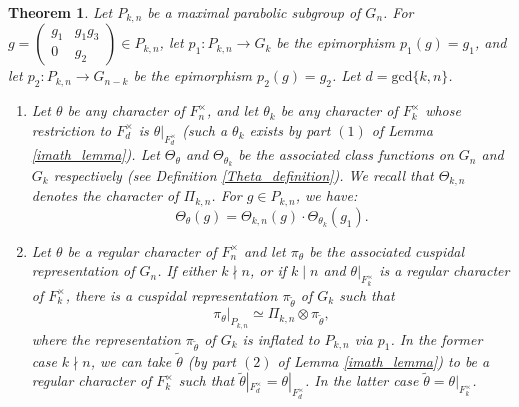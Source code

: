 \documentclass[reqno]{amsart}
\newtheorem{theorem}{Theorem}[section]
\theoremstyle{definition}
\theoremstyle{remark}
\numberwithin{equation}{section}
\DeclareMathOperator{\Ind}{Ind}
\DeclareMathOperator{\St}{St}
\newcommand{\bbsm}{\left (\begin{smallmatrix}}      \newcommand{\besm}{\end{smallmatrix}\right )}
\begin{document}
{{%
  \begin{theorem} \label{Pi_universal_property}
        Let $P_{k,n}$ be a maximal parabolic subgroup of $G_n$. For $g  = \bbsm g_1 & g_1 g_3 \\0 & g_2 \besm \in P_{k,n}$, let $p_1 \colon P_{k,n} \to G_k$ be the epimorphism $p_1(g)=g_1$, and let $p_2 \colon P_{k,n} \to G_{n-k}$ be the epimorphism $p_2(g)=g_2$. Let $d=\text{gcd}\{k,n\}$.
     \begin{enumerate}
         \item[\emph{(1)}] Let $\theta$ be any character of $F_n^\times$, and let 
         $\theta_k$ be any character of $F_k^\times$ whose restriction to $F_d^\times$ is $\theta|_{F_d^\times}$ (such a $\theta_k$ exists by  part $(1)$ of Lemma \ref{imath_lemma}). Let $\Theta_\theta$ and $\Theta_{\theta_k}$ be the associated class functions on $G_n$ and $G_k$ respectively (see Definition \ref{Theta_definition}). We recall that  $\Theta_{k,n}$ denotes  the character of $\Pi_{k,n}$. For $g \in P_{k,n}$, we have:
         \[  \Theta_\theta(g)= \Theta_{k,n}(g) \cdot \Theta_{\theta_k}(g_1).\]
    
\item[\emph{(2)}] Let $\theta$ be a regular character of $F_n^\times$ and let $\pi_\theta$ be the associated cuspidal representation of $G_n$. If  either $k \nmid n$, or if $k\mid n$  and $\theta|_{F_k^\times}$ is a regular character of $F_k^\times$, there is a cuspidal representation $\pi_{\tilde\theta}$ of $G_k$ such that 
    \[ \pi_\theta|_{P_{k,n}} \simeq \Pi_{k,n} \otimes \pi_{\tilde \theta},
    \]
    where the representation $\pi_{\tilde\theta}$ of $G_k$ is inflated to $P_{k,n}$ via $p_1$. In the former case $k \nmid n$, we can take $\tilde\theta$ (by part $(2)$ of Lemma \ref{imath_lemma})  to be a regular character of $F_k^\times$ such that  $\tilde\theta|_{F_d^\times} = \theta|_{F_d^\times}$. In the latter case $\tilde \theta = \theta|_{F_k^\times}$. \\
 

\end{enumerate}
\end{theorem}}}
\end{document}
